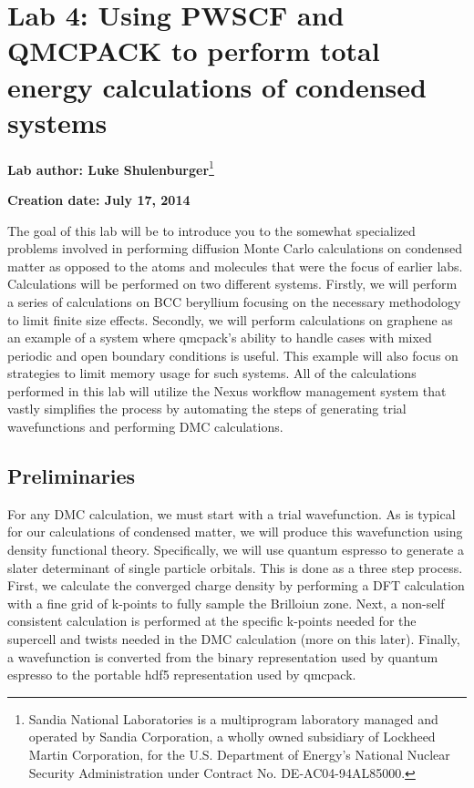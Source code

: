 \chapter{Lab 4: Using PWSCF and QMCPACK to perform total energy calculations of
condensed systems}

\begin{flushleft}
\textbf{Lab author: Luke Shulenburger}\footnote{Sandia National Laboratories is a multiprogram
laboratory managed and operated by Sandia Corporation, a wholly owned
subsidiary of Lockheed Martin Corporation, for the U.S. Department of Energy's
National Nuclear Security Administration under Contract No.
DE-AC04-94AL85000.}

\textbf{Creation date: July 17, 2014}
\end{flushleft}


The goal of this lab will be to introduce you to the somewhat specialized problems involved in performing diffusion Monte Carlo calculations on condensed matter as opposed to the atoms and molecules that were the focus of earlier labs.   Calculations will be performed on two different systems.  Firstly, we will perform a series of calculations on BCC beryllium focusing on the necessary methodology to limit finite size effects.  Secondly, we will perform calculations on graphene as an example of a system where qmcpack’s ability to handle cases with mixed periodic and open boundary conditions is useful.  This example will also focus on strategies to limit memory usage for such systems.
All of the calculations performed in this lab will utilize the Nexus workflow management system that vastly simplifies the process by automating the steps of generating trial wavefunctions and performing DMC calculations.

\newcommand{\vp}{\mathbf{a}^\text{p}}
\newcommand{\vs}{\mathbf{a}^\text{s}} 
\newcommand{\Smat}{\mathbf{S}}
\section{Preliminaries}
For any DMC calculation, we must start with a trial wavefunction. As is typical for our calculations of condensed matter, we will produce this wavefunction using density functional theory.  Specifically, we will use quantum espresso to generate a slater determinant of single particle orbitals.  This is done as a three step process.  First, we calculate the converged charge density by performing a DFT calculation with a fine grid of k-points to fully sample the Brilloiun zone.  Next, a non-self consistent calculation is performed at the specific k-points needed for the supercell and twists needed in the DMC calculation (more on this later).  Finally, a wavefunction is converted from the binary representation used by quantum espresso to the portable hdf5 representation used by qmcpack.

